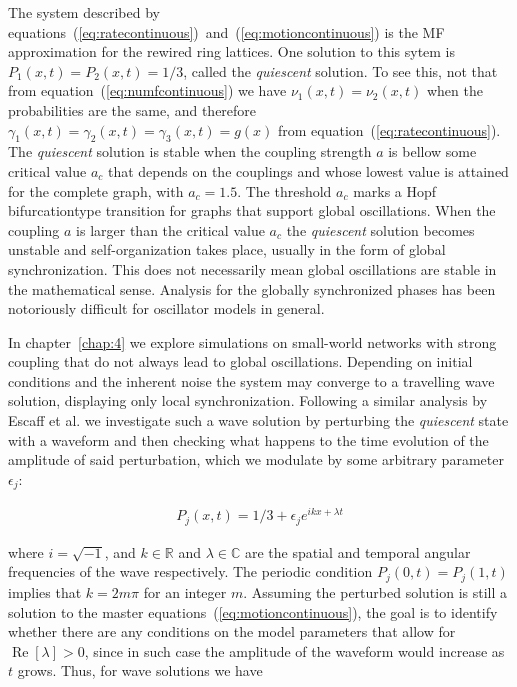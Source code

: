 The system described by equations~(\ref{eq:ratecontinuous})~and~(\ref{eq:motioncontinuous}) is the MF approximation for the rewired
ring lattices. One solution to this sytem is $P_1(x,t)=P_2(x,t)=1/3$, called the \textit{quiescent} solution. To see this, not that
from equation~(\ref{eq:numfcontinuous}) we have $\nu_1(x,t) = \nu_2(x,t)$ when the probabilities are the same, and therefore
$\gamma_1(x,t) = \gamma_2(x,t) = \gamma_3(x,t)=g(x)$ from equation~(\ref{eq:ratecontinuous}). The \textit{quiescent} solution is stable
when the coupling strength $a$ is bellow some critical value $a_c$ that depends on the couplings and whose lowest value is attained for
the complete graph, with $a_c=1.5$. The threshold $a_c$ marks a Hopf bifurcation\footnotemark type transition for graphs that support
global oscillations\cite{Wood06a}\cite{rodrigues2020synchronization}\cite{Wood06b}\cite{Wood07b}. When the coupling $a$ is larger than
the critical value $a_c$ the \textit{quiescent} solution becomes unstable and self-organization takes place, usually in the form of
global synchronization. This does not necessarily mean global oscillations are stable in the mathematical sense. Analysis for the
globally synchronized phases has been notoriously difficult for oscillator models in general.


In chapter~\ref{chap:4} we explore simulations on small-world networks with strong coupling that do not always lead to global
oscillations. Depending on initial conditions and the inherent noise the system may converge to a travelling wave solution, displaying
only local synchronization. Following a similar analysis by Escaff et al.\cite{escaff2014arrays} we investigate such a wave solution by
perturbing the \textit{quiescent} state with a waveform and then checking what happens to the time evolution of the amplitude of said
perturbation, which we modulate by some arbitrary parameter $\epsilon_j$:

\begin{align}
    P_j(x,t) = 1/3 + \epsilon_j e^{ikx + \lambda t}
    \label{eq:solperturb}
\end{align}

\noindent where $i=\sqrt{-1}$, and $k\in\mathbb{R}$ and $\lambda\in\mathbb{C}$ are the spatial and temporal angular frequencies of the
wave respectively. The periodic condition $P_j(0,t) = P_j(1,t)$ implies that $k=2m\pi$ for an integer $m$. Assuming the perturbed
solution is still a solution to the master equations~(\ref{eq:motioncontinuous}), the goal is to identify whether there are any
conditions on the model parameters that allow for $\operatorname{Re}[\lambda]>0$, since in such case the amplitude of the waveform
would increase as $t$ grows. Thus, for wave solutions we have

